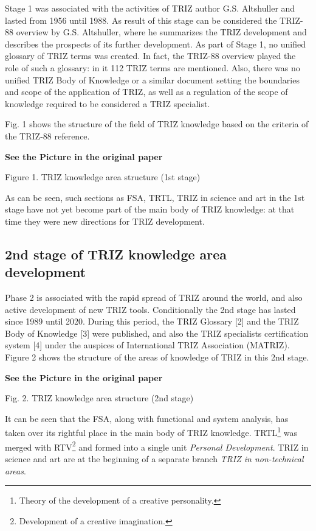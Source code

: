 \documentclass[11pt,a4paper]{article}
\newcommand{\addpicture}{\textbf{See the Picture in the original paper}\par}
\begin{document}
Stage 1 was associated with the activities of TRIZ author G.S. Altshuller and
lasted from 1956 until 1988. As result of this stage can be considered the
TRIZ-88 overview by G.S. Altshuller, where he summarizes the TRIZ development
and describes the prospects of its further development. As part of Stage 1, no
unified glossary of TRIZ terms was created.  In fact, the TRIZ-88 overview
played the role of such a glossary: in it 112 TRIZ terms are mentioned. Also,
there was no unified TRIZ Body of Knowledge or a similar document setting the
boundaries and scope of the application of TRIZ, as well as a regulation of
the scope of knowledge required to be considered a TRIZ specialist.

Fig. 1 shows the structure of the field of TRIZ knowledge based on the
criteria of the TRIZ-88 reference.

\begin{center}
  \addpicture
  Figure 1. TRIZ knowledge area structure (1st stage)
\end{center}
As can be seen, such sections as FSA, TRTL, TRIZ in science and art in the 1st
stage have not yet become part of the main body of TRIZ knowledge: at that
time they were new directions for TRIZ development.

\subsection{2nd stage of TRIZ knowledge area development}

Phase 2 is associated with the rapid spread of TRIZ around the world, and also
active development of new TRIZ tools. Conditionally the 2nd stage has lasted
since 1989 until 2020. During this period, the TRIZ Glossary [2] and the TRIZ
Body of Knowledge [3] were published, and also the TRIZ specialists
certification system [4] under the auspices of International TRIZ Association
(MATRIZ). Figure 2 shows the structure of the areas of knowledge of TRIZ in
this 2nd stage.

\begin{center}
  \addpicture
  Fig. 2. TRIZ knowledge area structure (2nd stage)
\end{center}
It can be seen that the FSA, along with functional and system analysis, has
taken over its rightful place in the main body of TRIZ knowledge.
TRTL\footnote{Theory of the development of a creative personality.} was merged
with RTV\footnote{Development of a creative imagination.} and formed into a
single unit \emph{Personal Development}. TRIZ in science and art are at the
beginning of a separate branch \emph{TRIZ in non-technical areas}.
\end{document}
